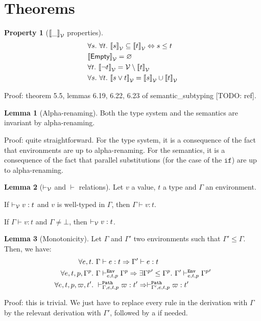 \documentclass[a4paper]{article}
\theoremstyle{definition}
\newtheorem{lemma}{Lemma}
\newtheorem{property}{Property}
\begin{document}
    \section{Theorems}

        \begin{property}[$\valsemantic \_$ properties]
          \begin{align*}
            &\forall s.\ \forall t.\ \valsemantic s \subseteq \valsemantic t \Leftrightarrow s \leq t\\
            &\valsemantic \Empty = \varnothing\\
            &\forall t.\ \valsemantic {\neg t} = \values \setminus \valsemantic t\\
            &\forall s.\ \forall t.\ \valsemantic {s\vee t} = \valsemantic s \cup \valsemantic t
          \end{align*}
        \end{property}
        Proof: theorem 5.5, lemmas 6.19, 6.22, 6.23 of semantic_subtyping [TODO: ref].

        \begin{lemma}[Alpha-renaming]
          Both the type system and the semantics are invariant by alpha-renaming.
        \end{lemma}
        Proof: quite straightforward.
        For the type system, it is a consequence of the fact that environments are up to alpha-renaming.
        For the semantics, it is a consequence of the fact that parallel substitutions (for the case of the $\texttt{if}$)
        are up to alpha-renaming.

        \begin{lemma}[$\vvdash$ and $\vdash$ relations]Let $v$ a value, $t$ a type and $\Gamma$ an environment.

          If $\vvdash v:t$ and $v$ is well-typed in $\Gamma$, then $\Gamma\vdash v:t$.

          If $\Gamma \vdash v:t$ and $\Gamma\neq\bot$, then $\vvdash v:t$.
        \end{lemma}
    
        \begin{lemma}[Monotonicity]
          Let $\Gamma$ and $\Gamma'$ two environments such that $\Gamma' \leq \Gamma$.
          Then, we have:
          \begin{align*}
            \forall e,t.\ &\Gamma \vdash e:t \Rightarrow \Gamma' \vdash e:t\\
            \forall e,t,p,\Gamma^p.\ &\Gamma \evdash p e t \Gamma^p \Rightarrow \exists {\Gamma^p}'\leq \Gamma^p.\ \Gamma' \evdash p e t {\Gamma^p}'\\
            \forall e,t,p,\varpi,t'.\ &\pvdash \Gamma p e t \varpi:t' \Rightarrow \pvdash {\Gamma'} p e t \varpi:t'
          \end{align*}
        \end{lemma}
        Proof: this is trivial. We just have to replace every  rule in the derivation with $\Gamma$
        by the relevant derivation with $\Gamma'$, followed by a  if needed.
\end{document}
